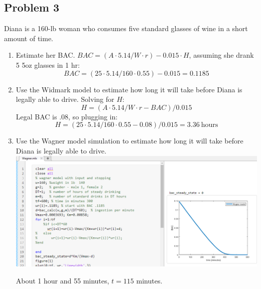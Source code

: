 \documentclass{article}
\newcommand{\myskip}{\par\null\par}
\begin{document}
\subsection*{Problem 3}Diana is a 160-lb woman who consumes five standard glasses of wine in a short amount of time.\begin{enumerate}[label=(\alph*)]
    \item Estimate her BAC. $BAC = (A\cdot 5.14 / W \cdot r) - 0.015\cdot H$, assuming she drank 5 5oz glasses in 1 hr: $$BAC=(25\cdot5.14/160\cdot0.55) - 0.015=0.1185$$ 
    \item Use the Widmark model to estimate how long it will take before Diana is legally able to drive. Solving for $H$: $$H = (A \cdot 5.14 / W\cdot r - BAC) / 0.015$$ Legal BAC is .08, so plugging in: $$H = (25\cdot 5.14 / 160\cdot0.55 - 0.08) / 0.015=3.36\ \mathrm{hours}$$
    \item Use the Wagner model simulation to estimate how long it will take before Diana is legally able to drive.\newline\includegraphics[scale=.4]{Pictures/Pic9.png}\myskip About 1 hour and 55 minutes, $t=115$ minutes.
\end{enumerate}
\end{document}
